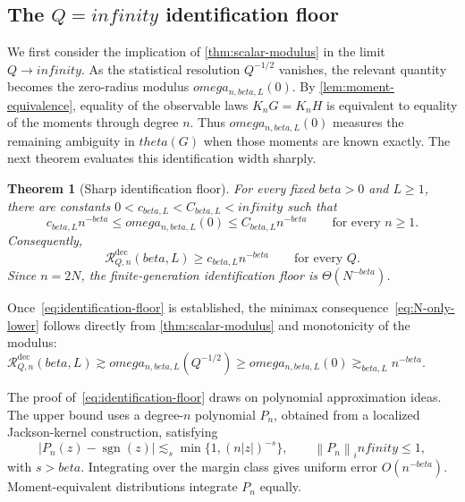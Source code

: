 \documentclass[11pt]{article}
\def\beta{beta}%
\def\theta{theta}%
\def\omega{omega}%
\def\infty{infinity}%
\newtheorem{theorem}{Theorem}[section]
\newcommand{\sgn}{\operatorname{sgn}}
\newcommand{\calR}{\mathcal R}
\newcommand{\norm}[1]{\left\lVert#1\right\rVert}
\newcommand\aed[1]{{\color{magenta!60!black} #1}}
\newcommand\eed[1]{{\color{green!45!black} #1}}
\begin{document}
\subsection{The \texorpdfstring{$Q=\infty$}{Q=infinity} identification floor}

\eed{We first consider the implication of \cref{thm:scalar-modulus} in the limit $Q\to\infty$.  As the statistical resolution $Q^{-1/2}$ vanishes, the relevant quantity becomes the zero-radius modulus $\omega_{n,\beta,L}(0)$.  By \cref{lem:moment-equivalence}, equality of the observable laws $K_nG=K_nH$ is equivalent to equality of the moments through degree $n$.  Thus $\omega_{n,\beta,L}(0)$ measures the remaining ambiguity in $\theta(G)$ when those moments are known exactly.  The next theorem evaluates this identification width sharply.}

\begin{theorem}[Sharp identification floor]
\label{thm:identification-floor}
For every fixed $\beta>0$ and $L\ge1$, there are constants $0<c_{\beta,L}<C_{\beta,L}<\infty$ such that
\begin{equation}
\label{eq:identification-floor}
 c_{\beta,L}n^{-\beta}
\le
\omega_{n,\beta,L}(0)
\le
C_{\beta,L}n^{-\beta}
\qquad\text{for every }n\ge1.
\end{equation}
Consequently,
\begin{equation}
\label{eq:N-only-lower}
\calR^{\mathrm{dec}}_{Q,n}(\beta,L)
\ge c_{\beta,L}n^{-\beta}
\qquad\text{for every }Q.
\end{equation}
Since $n=2N$, the finite-generation identification floor is $\Theta(N^{-\beta})$.
\end{theorem}

\eed{Once~\eqref{eq:identification-floor} is established, the minimax consequence~\eqref{eq:N-only-lower} follows directly from \cref{thm:scalar-modulus} and monotonicity of the modulus: $\calR^{\mathrm{dec}}_{Q,n}(\beta,L)\gtrsim\omega_{n,\beta,L}(Q^{-1/2})\ge\omega_{n,\beta,L}(0)\gtrsim_{\beta,L}n^{-\beta}$.}

\eed{The proof of~\eqref{eq:identification-floor} draws on polynomial approximation \aed{ideas}.  The upper bound uses a degree-$n$ polynomial $P_n$, obtained from a localized Jackson-kernel construction, satisfying}
\[
|P_n(z)-\sgn(z)|
\lesssim_s
\min\{1,(n|z|)^{-s}\},
\qquad \norm{P_n}_\infty\le1,
\]
with $s>\beta$. Integrating over the margin class gives uniform error $O(n^{-\beta})$.  Moment-equivalent distributions integrate $P_n$ equally.
\end{document}
